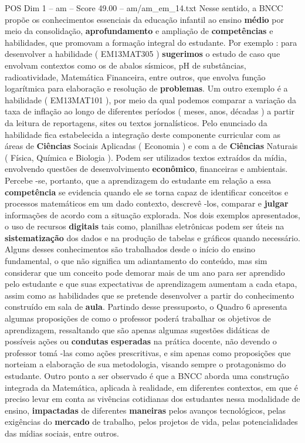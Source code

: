 \begin{textsample}{POS Dim 1 – am – Score 49.00 – am/am\_em\_14.txt}
Nesse sentido, a BNCC propõe os conhecimentos essenciais da educação infantil ao ensino \textbf{médio} por meio da consolidação, \textbf{aprofundamento} e ampliação de \textbf{competências} e habilidades, que promovam a formação integral do estudante.
Por exemplo : para desenvolver a habilidade ( EM13MAT305 ) \textbf{sugerimos} o estudo de caso que envolvam contextos como os de abalos sísmicos, pH de substâncias, radioatividade, Matemática Financeira, entre outros, que envolva função logarítmica para elaboração e resolução de \textbf{problemas}.
Um outro exemplo é a habilidade ( EM13MAT101 ), por meio da qual podemos comparar a variação da taxa de inflação ao longo de diferentes períodos ( meses, anos, décadas ) a partir da leitura de reportagens, sites ou textos jornalísticos.
Pelo enunciado da habilidade fica estabelecida a integração deste componente curricular com as áreas de \textbf{Ciências} Sociais Aplicadas ( Economia ) e com a de \textbf{Ciências} Naturais ( Física, Química e Biologia ).
Podem ser utilizados textos extraídos da mídia, envolvendo questões de desenvolvimento \textbf{econômico}, financeiras e ambientais.
Percebe -se, portanto, que a aprendizagem do estudante em relação a essa \textbf{competência} se evidencia quando ele se torna capaz de identificar conceitos e processos matemáticos em um dado contexto, descrevê -los, comparar e \textbf{julgar} informações de acordo com a situação explorada.
Nos dois exemplos apresentados, o uso de recursos \textbf{digitais} tais como, planilhas eletrônicas podem ser úteis na \textbf{sistematização} dos dados e na produção de tabelas e gráficos quando necessário.
Alguns desses conhecimentos são trabalhados desde o início do ensino fundamental, o que não significa um adiantamento do conteúdo, mas sim considerar que um conceito pode demorar mais de um ano para ser aprendido pelo estudante e que suas expectativas de aprendizagem aumentam a cada etapa, assim como as habilidades que se pretende desenvolver a partir do conhecimento construído em sala de \textbf{aula}.
Partindo desse pressuposto, o Quadro 6 apresenta algumas proposições de como o professor poderá trabalhar os objetivos de aprendizagem, ressaltando que são apenas algumas sugestões didáticas de possíveis ações ou \textbf{condutas} \textbf{esperadas} na prática docente, não devendo o professor tomá -las como ações prescritivas, e sim apenas como proposições que norteiam a elaboração de sua metodologia, visando sempre o protagonismo do estudante.
Outro ponto a ser observado é que a BNCC aborda uma construção integrada da Matemática, aplicada à realidade, em diferentes contextos, em que é preciso levar em conta as vivências cotidianas dos estudantes nessa modalidade de ensino, \textbf{impactadas} de diferentes \textbf{maneiras} pelos avanços tecnológicos, pelas exigências do \textbf{mercado} de trabalho, pelos projetos de vida, pelas potencialidades das mídias sociais, entre outros.

\end{textsample}
